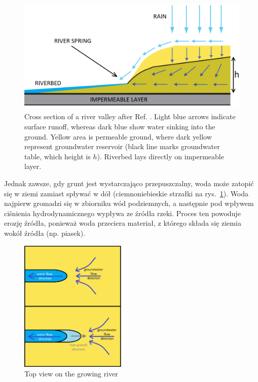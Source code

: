 \documentclass[]{pracamgr}
\begin{document}
    \begin{figure}[H]
      \centering
      \includegraphics[width=1\textwidth]{figs/pow_wsiakanie_eng.png}
      \caption { Cross section of a river valley after Ref. \cite{berhanu2012shape}. Light blue arrows indicate surface runoff, whereas dark blue show water sinking into the ground. Yellow area is permeable ground, where dark yellow represent groundwater reservoir (black line marks groundwater table, which height is $h$). Riverbed lays directly on impermeable layer.}
      \label{pow_wsiakanie}
    \end{figure}

    Jednak zawsze, gdy grunt jest wystarczająco przepuszczalny, woda może zatopić się w ziemi zamiast spływać w dół (ciemnoniebieskie strzałki na rys.~\ref{pow_wsiakanie}). Woda najpierw gromadzi się w zbiorniku wód podziemnych, a następnie pod wpływem ciśnienia hydrodynamicznego wypływa ze źródła rzeki. Proces ten powoduje erozję źródła, ponieważ woda przeciera materiał, z którego składa się ziemia wokół źródła (np. piasek).

    \begin{figure}
      \begin{center}
        \vspace{-20pt}
        \includegraphics[width=0.45\textwidth]{figs/zrodlo_eng.png}
      \end{center}
      \vspace{-20pt}
      \caption{Top view on the growing river}
      \vspace{0pt}
      \label{zrodlo}
    \end{figure}
\end{document}
